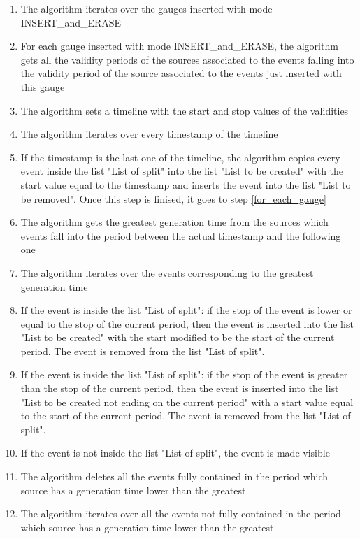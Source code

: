 \begin{enumerate}

\item The algorithm iterates over the gauges inserted with mode INSERT\_and\_ERASE
\item \label{for_each_gauge} For each gauge inserted with mode INSERT\_and\_ERASE, the algorithm gets all the validity periods of the sources associated to the events falling into the validity period of the source associated to the events just inserted with this gauge
\item The algorithm sets a timeline with the start and stop values of the validities
\item The algorithm iterates over every timestamp of the timeline
\item If the timestamp is the last one of the timeline, the algorithm copies every event inside the list "List of split" into the list "List to be created" with the start value equal to the timestamp and inserts the event into the list "List to be removed". Once this step is finised, it goes to step \ref{for_each_gauge}
\item The algorithm gets the greatest generation time from the sources which events fall into the period between the actual timestamp and the following one
\item The algorithm iterates over the events corresponding to the greatest generation time
\item If the event is inside the list "List of split": if the stop of the event is lower or equal to the stop of the current period, then the event is inserted into the list "List to be created" with the start modified to be the start of the current period. The event is removed from the list "List of split".
\item If the event is inside the list "List of split": if the stop of the event is greater than the stop of the current period, then the event is inserted into the list "List to be created not ending on the current period" with a start value equal to the start of the current period. The event is removed from the list "List of split".
\item If the event is not inside the list "List of split", the event is made visible
\item The algorithm deletes all the events fully contained in the period which source has a generation time lower than the greatest
\item The algorithm iterates over all the events not fully contained in the period which source has a generation time lower than the greatest

\end{enumerate}
